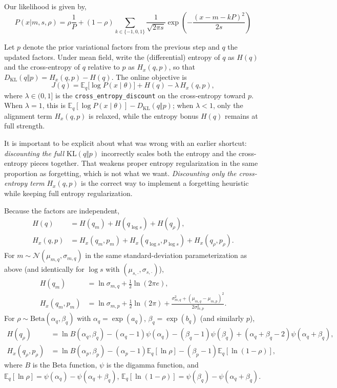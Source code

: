 Our likelihood is given by,
$$
P(x | m, s, \rho) = \rho \frac{1}{P} + (1 - \rho)\sum_{k \in \{-1, 0, 1\}} \frac{1}{\sqrt{2 \pi s}} \exp\left( -\frac{(x - m - k P)^2}{2 s} \right)
$$

Let $p$ denote the prior variational factors from the previous step and $q$ the updated factors.
Under mean field, write the (differential) entropy of $q$ as $H(q)$ and the cross-entropy of $q$ relative to $p$ as $H_x(q,p)$, so that $D_{\mathrm{KL}}(q\Vert p) = H_x(q,p) - H(q)$.
The online objective is
\begin{equation*}
    J(q) = \mathbb{E}_{q}\bigl[\log P(x \mid \theta)\bigr] + H(q) - \lambda\, H_x(q,p),
\end{equation*}
where $\lambda \in (0,1]$ is the \texttt{cross\_entropy\_discount} on the cross-entropy toward $p$.
When $\lambda = 1$, this is $\mathbb{E}_q[\log P(x\mid\theta)] - D_{\mathrm{KL}}(q\Vert p)$; when $\lambda < 1$, only the alignment term $H_x(q,p)$ is relaxed, while the entropy bonus $H(q)$ remains at full strength.

It is important to be explicit about what was wrong with an earlier shortcut: \emph{discounting the full $\mathrm{KL}(q\Vert p)$} incorrectly scales both the entropy and the cross-entropy pieces together.
That weakens proper entropy regularization in the same proportion as forgetting, which is not what we want.
\emph{Discounting only the cross-entropy term} $H_x(q,p)$ is the correct way to implement a forgetting heuristic while keeping full entropy regularization.

Because the factors are independent,
\begin{align*}
    H(q) &= H(q_m) + H(q_{\log s}) + H(q_\rho), \\
    H_x(q,p) &= H_x(q_m, p_m) + H_x(q_{\log s}, p_{\log s}) + H_x(q_\rho, p_\rho).
\end{align*}
For $m \sim \mathcal{N}(\mu_{m,q}, \sigma_{m,q})$ in the same standard-deviation parameterization as above (and identically for $\log s$ with $(\mu_{s,\cdot}, \sigma_{s,\cdot})$),
\begin{align*}
    H(q_m) &= \ln \sigma_{m,q} + \tfrac{1}{2}\ln(2\pi e), \\
    H_x(q_m, p_m) &= \ln \sigma_{m,p} + \tfrac{1}{2}\ln(2\pi) + \frac{\sigma_{m,q}^2 + (\mu_{m,q} - \mu_{m,p})^2}{2\sigma_{m,p}^2}.
\end{align*}
For $\rho \sim \mathrm{Beta}(\alpha_q, \beta_q)$ with $\alpha_q = \exp(a_q)$, $\beta_q = \exp(b_q)$ (and similarly $p$),
\begin{align*}
    H(q_\rho) &= \ln B(\alpha_q, \beta_q) - (\alpha_q - 1)\psi(\alpha_q) - (\beta_q - 1)\psi(\beta_q) + (\alpha_q + \beta_q - 2)\psi(\alpha_q + \beta_q), \\
    H_x(q_\rho, p_\rho) &= \ln B(\alpha_p, \beta_p) - (\alpha_p - 1)\mathbb{E}_q[\ln \rho] - (\beta_p - 1)\mathbb{E}_q[\ln(1-\rho)],
\end{align*}
where $B$ is the Beta function, $\psi$ is the digamma function, and $\mathbb{E}_q[\ln \rho] = \psi(\alpha_q) - \psi(\alpha_q + \beta_q)$, $\mathbb{E}_q[\ln(1-\rho)] = \psi(\beta_q) - \psi(\alpha_q + \beta_q)$.

